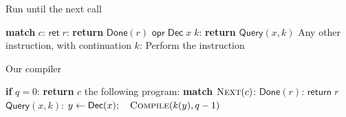 \begin{frame}{Run until the next call}
  \begin{center}
    \begin{minipage}{0.90\textwidth}
      \begin{algorithm}[H]
        \caption{Traversing the AST}
        \begin{algorithmic}
          \small
            \State \textbf{match} $c$:
            \State \hspace{1em} $\mathsf{ret}\;r$: \textbf{return} $\mathsf{Done}(r)$
            \State \hspace{1em} $\mathsf{opr}\;\mathsf{Dec}\;x\;k$: \textbf{return} $\mathsf{Query}(x,k)$
            \State \hspace{1em} Any other instruction, with continuation $k$:
            \State \hspace{2em} Perform the instruction
            \State \hspace{2em} \Return {}
          \EndFunction
        \end{algorithmic}
      \end{algorithm}
    \end{minipage}
  \end{center}
\end{frame}

\begin{frame}{Our compiler}
  \begin{center}
    \begin{minipage}{0.90\textwidth}
      \begin{algorithm}[H]
        \caption{Expose up to $q$ decryption calls}
        \begin{algorithmic}
          \small
            \State \textbf{if} $q=0$: \textbf{return} $c$
            \State \Return the following program:
            \State \hspace{1em} \textbf{match} $\Call{Next}{c}$:
            \State \hspace{2em} $\mathsf{Done}(r)$: $\mathsf{return}\;r$
            \State \hspace{2em} $\mathsf{Query}(x,k)$:
            \State \hspace{3em} $y\leftarrow\mathsf{Dec}(x);\quad\Call{Compile}{k(y),q-1}$
          \EndFunction
        \end{algorithmic}
      \end{algorithm}
    \end{minipage}
  \end{center}
\end{frame}
